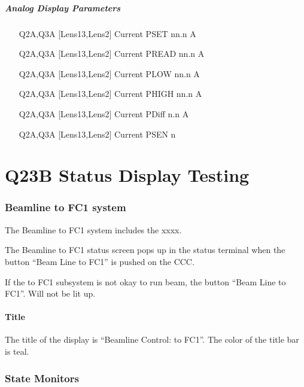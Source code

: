 \documentclass[11pt]{book}		%
\begin{document}
\paragraph{Analog Display Parameters}

\begin{enumerate}
 \item [Q2A,Q3A] [Lens13,Lens2] Current PSET   nn.n A
 \item [Q2A,Q3A] [Lens13,Lens2] Current PREAD  nn.n A
 \item [Q2A,Q3A] [Lens13,Lens2] Current PLOW   nn.n A
 \item [Q2A,Q3A] [Lens13,Lens2] Current PHIGH  nn.n A
 \item [Q2A,Q3A] [Lens13,Lens2] Current PDiff n.n A
 \item [Q2A,Q3A] [Lens13,Lens2] Current PSEN  n
\end{enumerate}




\chapter{Q23B Status Display Testing}


\subsection{Beamline to FC1 system} \label{sect:cyc-op-interface-status-terminal-display-contents-beamline-fc1}

The Beamline to FC1 system includes the xxxx.

The Beamline to FC1 status screen pops up in the status terminal when the button ``Beam Line to FC1'' is pushed on the CCC.

If the to FC1 subsystem is not okay to run beam, the button ``Beam Line to FC1''. Will not be lit up.


\subsubsection{Title}\label{sect:cyc-op-interface-status-terminal-display-contents-beamline-fc1-title}

The title of the display is ``Beamline Control: to FC1''.  The color of the title bar is teal.

\subsection{State Monitors} \label{sect:cyc-op-interface-status-beamline-tofc1-state-monitors}
\end{document}

